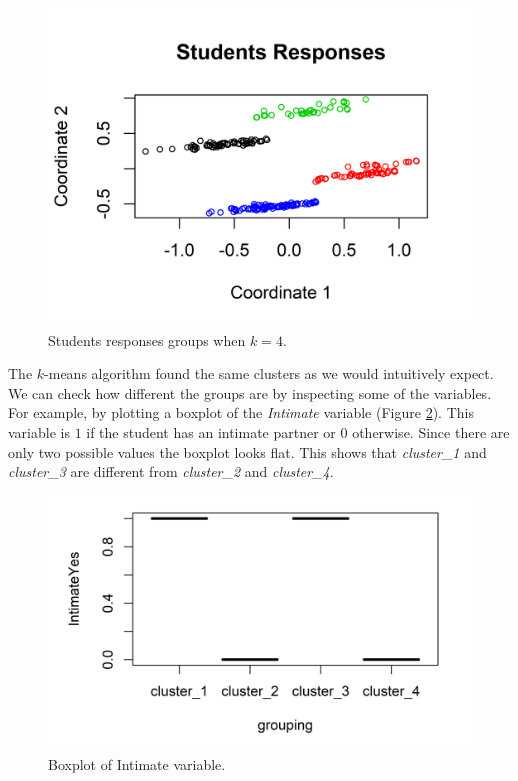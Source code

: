 \documentclass[
  11pt,
]{krantz}
\begin{document}
\begin{figure}

{\centering \includegraphics[width=0.9\linewidth]{images/cluster2} 

}

\caption{Students responses groups when \(k=4\).}\label{fig:cluster2}
\end{figure}

The \(k\)-means algorithm found the same clusters as we would intuitively expect. We can check how different the groups are by inspecting some of the variables. For example, by plotting a boxplot of the \emph{Intimate} variable (Figure \ref{fig:intyes}). This variable is \(1\) if the student has an intimate partner or \(0\) otherwise. Since there are only two possible values the boxplot looks flat. This shows that \emph{cluster\_1} and \emph{cluster\_3} are different from \emph{cluster\_2} and \emph{cluster\_4}.

\begin{figure}

{\centering \includegraphics[width=0.9\linewidth]{images/bp_intimate} 

}

\caption{Boxplot of Intimate variable.}\label{fig:intyes}
\end{figure}
\end{document}
